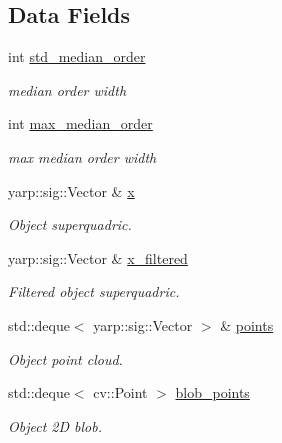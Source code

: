 \subsection*{Data Fields}
\begin{DoxyCompactItemize}
\item 
\mbox{\label{classSuperqComputation_ab30b0c645ad52b61fe7a947eb3c227ed}} 
int \mbox{\hyperlink{classSuperqComputation_ab30b0c645ad52b61fe7a947eb3c227ed}{std\+\_\+median\+\_\+order}}
\begin{DoxyCompactList}\small\item\em median order width \end{DoxyCompactList}\item 
\mbox{\label{classSuperqComputation_af8ec20c3b393c5f82c6662a0a2c1145d}} 
int \mbox{\hyperlink{classSuperqComputation_af8ec20c3b393c5f82c6662a0a2c1145d}{max\+\_\+median\+\_\+order}}
\begin{DoxyCompactList}\small\item\em max median order width \end{DoxyCompactList}\item 
\mbox{\label{classSuperqComputation_a3973557e78ae06f3f32d6e279585f4ac}} 
yarp\+::sig\+::\+Vector \& \mbox{\hyperlink{classSuperqComputation_a3973557e78ae06f3f32d6e279585f4ac}{x}}
\begin{DoxyCompactList}\small\item\em Object superquadric. \end{DoxyCompactList}\item 
\mbox{\label{classSuperqComputation_a7e297c9aaff44b1c83e2134f17f9d949}} 
yarp\+::sig\+::\+Vector \& \mbox{\hyperlink{classSuperqComputation_a7e297c9aaff44b1c83e2134f17f9d949}{x\+\_\+filtered}}
\begin{DoxyCompactList}\small\item\em Filtered object superquadric. \end{DoxyCompactList}\item 
\mbox{\label{classSuperqComputation_a1d88efa996ff50a62e46bbf4fb8bca0b}} 
std\+::deque$<$ yarp\+::sig\+::\+Vector $>$ \& \mbox{\hyperlink{classSuperqComputation_a1d88efa996ff50a62e46bbf4fb8bca0b}{points}}
\begin{DoxyCompactList}\small\item\em Object point cloud. \end{DoxyCompactList}\item 
\mbox{\label{classSuperqComputation_a4862f75f1f976e449f434bd1d78f8445}} 
std\+::deque$<$ cv\+::\+Point $>$ \mbox{\hyperlink{classSuperqComputation_a4862f75f1f976e449f434bd1d78f8445}{blob\+\_\+points}}
\begin{DoxyCompactList}\small\item\em Object 2D blob. \end{DoxyCompactList}\end{DoxyCompactItemize}
